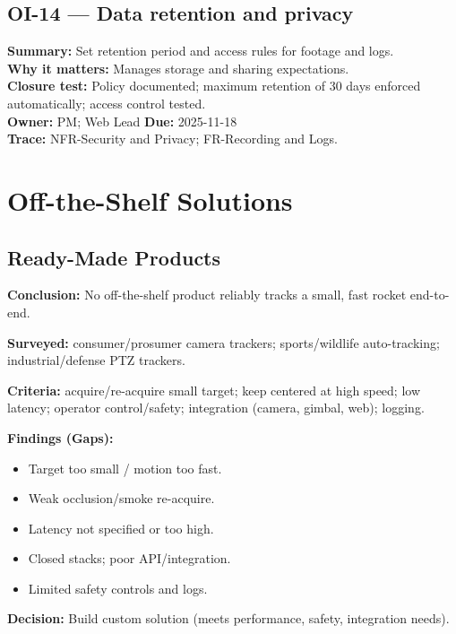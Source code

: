 \documentclass[12pt]{article}
\begin{document}
\subsection*{OI-14 — Data retention and privacy}
\textbf{Summary:} Set retention period and access rules for footage and logs.\\
\textbf{Why it matters:} Manages storage and sharing expectations.\\
\textbf{Closure test:} Policy documented; maximum retention of 30 days enforced automatically; access control tested.\\
\textbf{Owner:} PM; Web Lead \quad \textbf{Due:} 2025-11-18\\
\textbf{Trace:} NFR-Security and Privacy; FR-Recording and Logs.



\section{Off-the-Shelf Solutions}
\subsection{Ready-Made Products}
\label{sec:ready-made-products}

\textbf{Conclusion:} No off-the-shelf product reliably tracks a small, fast rocket end-to-end.

\textbf{Surveyed:} consumer/prosumer camera trackers; sports/wildlife auto-tracking; industrial/defense PTZ trackers.

\textbf{Criteria:} acquire/re-acquire small target; keep centered at high speed; low latency; operator control/safety; integration (camera, gimbal, web); logging.

\textbf{Findings (Gaps):}
\begin{itemize}[noitemsep,topsep=2pt]
  \item Target too small / motion too fast.
  \item Weak occlusion/smoke re-acquire.
  \item Latency not specified or too high.
  \item Closed stacks; poor API/integration.
  \item Limited safety controls and logs.
\end{itemize}

\textbf{Decision:} Build custom solution (meets performance, safety, integration needs).
\end{document}
